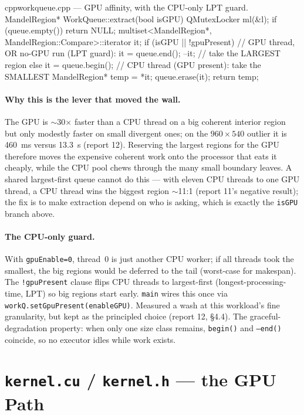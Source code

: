 \documentclass[
	english,
	letterpaper, oneside
]{article}
\begin{document}
\begin{sourcecode}{cpp}{workqueue.cpp --- GPU affinity, with the CPU-only LPT guard.}
MandelRegion* WorkQueue::extract(bool isGPU) {
  QMutexLocker ml(&l);
  if (queue.empty()) return NULL;
  multiset<MandelRegion*, MandelRegion::Compare>::iterator it;
  if (isGPU || !gpuPresent) {        // GPU thread, OR no-GPU run (LPT guard):
      it = queue.end(); --it;        //   take the LARGEST region
  } else
      it = queue.begin();            // CPU thread (GPU present): take the SMALLEST
  MandelRegion* temp = *it;
  queue.erase(it);
  return temp;
}
\end{sourcecode}

\paragraph{Why this is the lever that moved the wall.} The GPU is $\sim$30$\times$
faster than a CPU thread on a big coherent interior region but only modestly
faster on small divergent ones; on the $960\times540$ outlier it is 460~ms versus
13.3~s (report 12). Reserving the largest regions for the GPU therefore moves the
expensive coherent work onto the processor that eats it cheaply, while the CPU pool
chews through the many small boundary leaves. A shared largest-first queue
cannot do this --- with eleven CPU threads to one GPU thread, a CPU thread wins the
biggest region $\sim$11:1 (report 11's negative result); the fix is to make
extraction depend on who is asking, which is exactly the \texttt{isGPU}
branch above.

\paragraph{The CPU-only guard.} With \texttt{gpuEnable=0}, thread~0 is just another
CPU worker; if all threads took the smallest, the big regions would be deferred to
the tail (worst-case for makespan). The \texttt{!gpuPresent} clause flips CPU
threads to largest-first (longest-processing-time, LPT) so big regions start early.
\texttt{main} wires this once via \texttt{workQ.setGpuPresent(enableGPU)}. Measured
a wash at this workload's fine granularity, but kept as the principled choice
(report 12, \S4.4). The graceful-degradation property: when only one size class
remains, \texttt{begin()} and \texttt{--end()} coincide, so no executor idles while
work exists.

\section{\texttt{kernel.cu} / \texttt{kernel.h} --- the GPU Path}
\label{sec:kernel}
\end{document}
